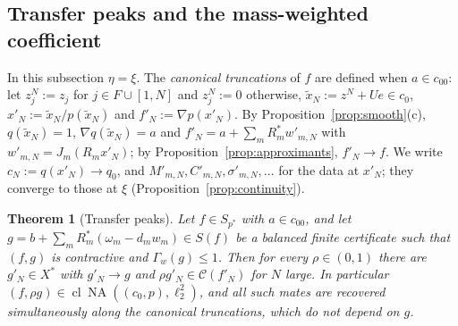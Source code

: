 \documentclass[10pt]{amsart}
\newtheorem{theorem}{Theorem}[section]
\theoremstyle{definition}
\theoremstyle{remark}
\newcommand{\NA}{\operatorname{NA}}
\newcommand{\Cset}{\mathcal C}
\newcommand{\cl}{\operatorname{cl}}
\begin{document}
\subsection{Transfer peaks and the mass-weighted coefficient}
In this subsection $\eta=\xi$.  The \emph{canonical truncations} of $f$
are defined when $a\in c_{00}$: let $z^N_j:=z_j$ for $j\in F\cup[1,N]$ and
$z^N_j:=0$ otherwise, $\tilde x_N:=z^N+Ue\in c_0$, $x'_N:=\tilde
x_N/p(\tilde x_N)$ and $f'_N:=\nabla p(x'_N)$.  By
Proposition~\ref{prop:smooth}(c), $q(\tilde x_N)=1$, $\nabla q(\tilde
x_N)=a$ and $f'_N=a+\sum_mR_m^*w'_{m,N}$ with $w'_{m,N}=J_m(R_mx'_N)$; by
Proposition~\ref{prop:approximants}, $f'_N\to f$.  We write
$c_N:=q(x'_N)\to q_0$, and $M'_{m,N},C'_{m,N},\sigma'_{m,N},\dots$ for the
data at $x'_N$; they converge to those at $\xi$
(Proposition~\ref{prop:continuity}).

\begin{theorem}[Transfer peaks]\label{thm:transfer}
Let $f\in S_{p^*}$ with $a\in c_{00}$, and let
$g=b+\sum_mR_m^*(\omega_m-d_mw_m)\in S(f)$ be a balanced finite certificate
such that $(f,g)$ is contractive and $\Gamma_w(g)\le1$.  Then for every
$\rho\in(0,1)$ there are $g'_N\in X^*$ with $g'_N\to g$ and
$\rho g'_N\in\Cset(f'_N)$ for $N$ large.  In particular
$(f,\rho g)\in\cl\NA((c_0,p),\ell_2^2)$, and
all such mates are recovered simultaneously along the canonical truncations,
which do not depend on $g$.
\end{theorem}
\end{document}
